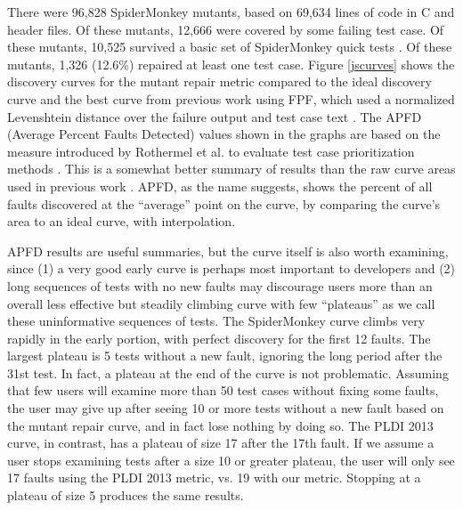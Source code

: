 There were 96,828 SpiderMonkey mutants, based on 69,634 lines of code in C and header files.  Of these mutants, 12,666 were covered by some failing test case.  Of these mutants, 10,525 survived a basic set of SpiderMonkey quick tests \cite{icst2014}.  Of these mutants, 1,326 (12.6\%) repaired at least one test case.  Figure \ref{jscurves} shows the discovery curves for the mutant repair metric compared to the ideal discovery curve and the best curve from previous work using FPF, which used a normalized Levenshtein distance \cite{lev} over the failure output and test case text \cite{PLDI13}.  The APFD (Average Percent Faults Detected) values shown in the graphs are based on the measure  introduced by Rothermel et al. to evaluate test case prioritization methods \cite{APFD}.  This is a somewhat better summary of results than the raw curve areas used in previous work \cite{PLDI13}.  APFD, as the name suggests, shows the percent of all faults discovered at the ``average'' point on the curve, by comparing the curve's area to an ideal curve, with interpolation.

APFD results are useful summaries, but the curve itself is also worth examining, since (1) a very good early curve is perhaps most important to developers and (2) long sequences of tests with no new faults may discourage users more than an overall less effective but steadily climbing curve with few ``plateaus'' as we call these uninformative sequences of tests.  The SpiderMonkey curve climbs very rapidly in the early portion, with perfect discovery for the first 12 faults. The largest plateau is 5 tests without a new fault, ignoring the long period after the 31st test.  In fact, a plateau at the end of the curve is not problematic.  Assuming that few users will examine more than 50 test cases without fixing some faults, the user may give up after seeing 10 or more tests without a new fault based on the mutant repair curve, and in fact lose nothing by doing so.  The PLDI 2013 curve, in contrast, has a plateau of size 17 after the 17th fault.  If we assume a user stops examining tests after a size 10 or greater plateau, the user will only see 17 faults using the PLDI 2013 metric, vs. 19 with our metric.  Stopping at a plateau of size 5 produces the same results.

